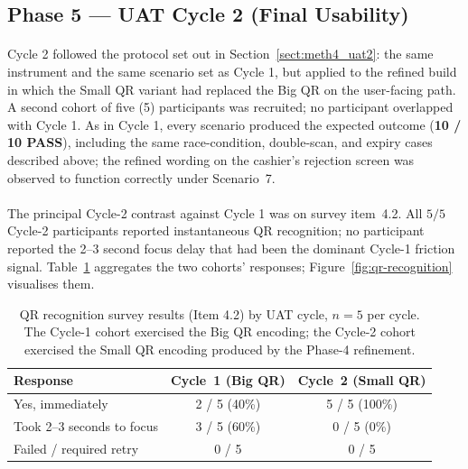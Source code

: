 \subsection{Phase 5 --- UAT Cycle 2 (Final Usability)}
\label{sect:results_uat2}

\paragraph{}Cycle 2 followed the protocol set out in Section~\ref{sect:meth4_uat2}: the same instrument and the same scenario set as Cycle 1, but applied to the refined build in which the Small QR variant had replaced the Big QR on the user-facing path. A second cohort of five (5) participants was recruited; no participant overlapped with Cycle 1. As in Cycle 1, every scenario produced the expected outcome (\textbf{10 / 10 PASS}), including the same race-condition, double-scan, and expiry cases described above; the refined wording on the cashier's rejection screen was observed to function correctly under Scenario~7.

\paragraph{}The principal Cycle-2 contrast against Cycle 1 was on survey item~4.2. All $5 / 5$ Cycle-2 participants reported instantaneous QR recognition; no participant reported the 2--3 second focus delay that had been the dominant Cycle-1 friction signal. Table~\ref{tab:qr-recognition} aggregates the two cohorts' responses; Figure~\ref{fig:qr-recognition} visualises them.

\begin{table}[H]
  \centering
  \caption{QR recognition survey results (Item 4.2) by UAT cycle, $n = 5$ per cycle. The Cycle-1 cohort exercised the Big QR encoding; the Cycle-2 cohort exercised the Small QR encoding produced by the Phase-4 refinement.}
  \label{tab:qr-recognition}
  \begin{tabular}{|l|c|c|}
    \hline
    Response & Cycle~1 (Big QR) & Cycle~2 (Small QR) \\\hline
    Yes, immediately & 2 / 5 (40\%) & 5 / 5 (100\%) \\\hline
    Took 2--3 seconds to focus & 3 / 5 (60\%) & 0 / 5 (0\%) \\\hline
    Failed / required retry & 0 / 5 & 0 / 5 \\\hline
  \end{tabular}
\end{table}

